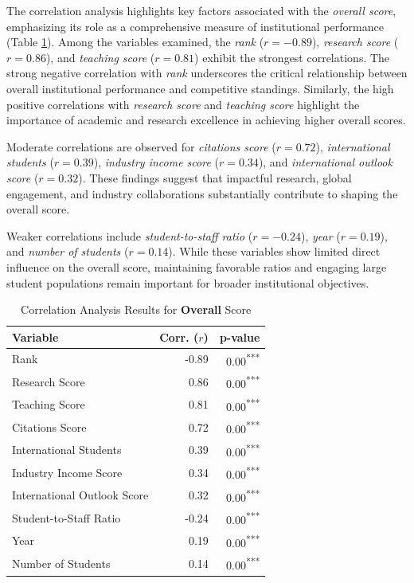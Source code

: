 \documentclass[sigconf]{acmart}
\begin{document}
The correlation analysis highlights key factors associated with the \textit{overall score}, emphasizing its role as a comprehensive measure of institutional performance (Table \ref{tab:correlation_overall}). Among the variables examined, the \textit{rank} ($r = -0.89$), \textit{research score} ($r = 0.86$), and \textit{teaching score} ($r = 0.81$) exhibit the strongest correlations. The strong negative correlation with \textit{rank} underscores the critical relationship between overall institutional performance and competitive standings. Similarly, the high positive correlations with \textit{research score} and \textit{teaching score} highlight the importance of academic and research excellence in achieving higher overall scores.

Moderate correlations are observed for \textit{citations score} ($r = 0.72$), \textit{international students} ($r = 0.39$), \textit{industry income score} ($r = 0.34$), and \textit{international outlook score} ($r = 0.32$). These findings suggest that impactful research, global engagement, and industry collaborations substantially contribute to shaping the overall score.

Weaker correlations include \textit{student-to-staff ratio} ($r = -0.24$), \textit{year} ($r = 0.19$), and \textit{number of students} ($r = 0.14$). While these variables show limited direct influence on the overall score, maintaining favorable ratios and engaging large student populations remain important for broader institutional objectives.

\begin{table}[h!]
	\centering
	\caption{Correlation Analysis Results for \textbf{Overall} Score}
	\label{tab:correlation_overall}
	\begin{tabular}{|l|r|r|}
		\hline
		\textbf{Variable} & \textbf{Corr. ($r$)} & \textbf{p-value} \\
		\hline
		Rank & -0.89 & 0.00\textsuperscript{***} \\
		Research Score & 0.86 & 0.00\textsuperscript{***} \\
		Teaching Score & 0.81 & 0.00\textsuperscript{***} \\
		Citations Score & 0.72 & 0.00\textsuperscript{***} \\
		International Students & 0.39 & 0.00\textsuperscript{***} \\
		Industry Income Score & 0.34 & 0.00\textsuperscript{***} \\
		International Outlook Score & 0.32 & 0.00\textsuperscript{***} \\
		Student-to-Staff Ratio & -0.24 & 0.00\textsuperscript{***} \\
		Year & 0.19 & 0.00\textsuperscript{***} \\
		Number of Students & 0.14 & 0.00\textsuperscript{***} \\
		\hline
	\end{tabular}
\end{table}
\end{document}
